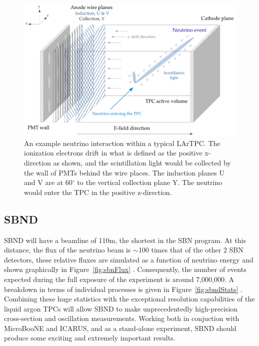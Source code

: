     \begin{figure}[h!]
        \center
        \includegraphics[width=.85\textwidth]{images/LArTPC.pdf}
        \caption{An example neutrino interaction within a typical LArTPC. The ionization electrons drift in what is defined as the positive x-direction as shown, and the scintillation light would be collected by the wall of PMTs behind the wire places. The induction planes U and V are at 60$^{\circ}$ to the vertical collection plane Y. The neutrino would enter the TPC in the positive z-direction.}
        \label{fig:lartpc}
    \end{figure}

\subsection{SBND}    

SBND will have a beamline of 110m, the shortest in the SBN program. At this distance, the flux of the neutrino beam is $\sim$100 times that of the other 2 SBN detectors, these relative fluxes are simulated as a function of neutrino energy and shown graphically in Figure~\ref{fig:sbnFlux} \cite{sbn}. Consequently, the number of events expected during the full exposure of the experiment is around 7,000,000. A breakdown in terms of individual processes is given in Figure~\ref{fig:sbndStats} \cite{sbn}. Combining these huge statistics with the exceptional resolution capabilities of the liquid argon TPCs will allow SBND to make unprecedentedly high-precision cross-section and oscillation measurements. Working both in conjuction with MicroBooNE and ICARUS, and as a stand-alone experiment, SBND should produce some exciting and extremely important results.


